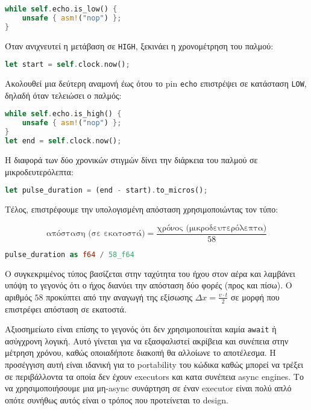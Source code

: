 \begin{lstlisting}[language=Rust]
while self.echo.is_low() {
    unsafe { asm!("nop") };
}
\end{lstlisting}

Όταν ανιχνευτεί η μετάβαση σε \verb|HIGH|, ξεκινάει η χρονομέτρηση του παλμού:

\begin{lstlisting}[language=Rust]
let start = self.clock.now();
\end{lstlisting}

Ακολουθεί μια δεύτερη αναμονή έως ότου το pin \verb|echo| επιστρέψει σε κατάσταση \verb|LOW|, δηλαδή όταν τελειώσει ο παλμός:

\begin{lstlisting}[language=Rust]
while self.echo.is_high() {
    unsafe { asm!("nop") };
}
let end = self.clock.now();
\end{lstlisting}

Η διαφορά των δύο χρονικών στιγμών δίνει την διάρκεια του παλμού σε μικροδευτερόλεπτα:

\begin{lstlisting}[language=Rust]
let pulse_duration = (end - start).to_micros();
\end{lstlisting}

Τέλος, επιστρέφουμε την υπολογισμένη απόσταση χρησιμοποιώντας τον τύπο:

\[
\text{απόσταση (σε εκατοστά)} = \frac{\text{χρόνος (μικροδευτερόλεπτα)}}{58}
\]

\begin{lstlisting}[language=Rust]
pulse_duration as f64 / 58_f64
\end{lstlisting}

Ο συγκεκριμένος τύπος βασίζεται στην ταχύτητα του ήχου στον αέρα και
λαμβάνει υπόψη το γεγονός ότι ο ήχος διανύει την απόσταση δύο φορές
(προς και πίσω). Ο αριθμός $58$ προκύπτει από την αναγωγή της εξίσωσης
$\Delta x = \frac{v \cdot t}{2}$ σε μορφή που επιστρέφει απόσταση σε
εκατοστά.

Αξιοσημείωτο είναι επίσης το γεγονός ότι δεν χρησιμοποιείται καμία
\verb|await| ή ασύγχρονη λογική. Αυτό γίνεται για να εξασφαλιστεί
ακρίβεια και συνέπεια στην μέτρηση χρόνου, καθώς οποιαδήποτε διακοπή
θα αλλοίωνε το αποτέλεσμα. Η προσέγγιση αυτή είναι ιδανική για το
portability του κώδικα καθώς μπορεί να τρέξει σε περιβάλλοντα τα οποία
δεν έχουν executors και κατα συνέπεια async engines. Το να
χρησιμοποιήσουμε μια μη-async συνάρτηση σε έναν executor είναι πολύ
απλό οπότε συνήθως αυτός είναι ο τρόπος που προτείνεται το design.


